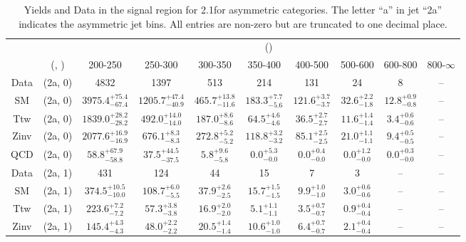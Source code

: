 \begin{table}[h!]
\tiny
\centering
\caption{Yields and Data in the signal region for 2.1\ifb for asymmetric categories. The letter ``a'' in jet \eg ``2a''  indicates the asymmetric jet bins. All entries are non-zero but are truncated to one decimal place.\label{tab:yieldsallqcd_sig_comb_asym}}
\begin{tabular}
{cccccccccc}
	\hline\hline
	&	& \multicolumn{8}{c}{\scalht (\gev)}\\ 
	&	 (\njet, \nb) & 200-250 & 250-300 & 300-350 & 350-400 & 400-500 & 500-600 & 600-800 & 800-$\infty$ \\ [0.8ex] 
\hline
	Data & (2a, 0) & 4832 & 1397 & 513 & 214 & 131 & 24 & 8 & -- \\[0.5ex] 
	SM & (2a, 0) & $3975.4^{+ 75.4 }_{- 67.4 }$ & $1205.7^{+ 47.4 }_{- 40.9 }$ & $465.7^{+ 13.8 }_{- 11.6 }$ & $183.3^{+ 7.7 }_{- 5.6 }$ & $121.6^{+ 3.7 }_{- 3.7 }$ & $32.6^{+ 2.2 }_{- 1.8 }$ & $12.8^{+ 0.9 }_{- 0.8 }$ & -- \\[0.5ex] 
	Ttw & (2a, 0) & $1839.0^{+ 28.2 }_{- 28.2 }$ & $492.0^{+ 14.0 }_{- 14.0 }$ & $187.0^{+ 8.6 }_{- 8.6 }$ & $64.5^{+ 4.6 }_{- 4.6 }$ & $36.5^{+ 2.7 }_{- 2.7 }$ & $11.6^{+ 1.4 }_{- 1.4 }$ & $3.4^{+ 0.6 }_{- 0.6 }$ & -- \\[0.5ex] 
	Zinv & (2a, 0) & $2077.6^{+ 16.9 }_{- 16.9 }$ & $676.1^{+ 8.3 }_{- 8.3 }$ & $272.8^{+ 5.2 }_{- 5.2 }$ & $118.8^{+ 3.2 }_{- 3.2 }$ & $85.1^{+ 2.5 }_{- 2.5 }$ & $21.0^{+ 1.1 }_{- 1.1 }$ & $9.4^{+ 0.5 }_{- 0.5 }$ & -- \\[0.5ex] 
	QCD & (2a, 0) & $58.8^{+ 67.9 }_{- 58.8 }$ & $37.5^{+ 44.5 }_{- 37.5 }$ & $5.8^{+ 9.6 }_{- 5.8 }$ & $0.0^{+ 5.3 }_{- 0.0 }$ & $0.0^{+ 0.4 }_{- 0.0 }$ & $0.0^{+ 1.2 }_{- 0.0 }$ & $0.0^{+ 0.3 }_{- 0.0 }$ & -- \\[0.5ex] 
	Data & (2a, 1) & 431 & 124 & 44 & 15 & 7 & 3 & -- & -- \\[0.5ex] 
	SM & (2a, 1) & $374.5^{+ 10.5 }_{- 10.0 }$ & $108.7^{+ 6.0 }_{- 5.5 }$ & $37.9^{+ 2.6 }_{- 2.5 }$ & $15.7^{+ 1.5 }_{- 1.5 }$ & $9.9^{+ 1.0 }_{- 1.0 }$ & $3.0^{+ 0.6 }_{- 0.6 }$ & -- & -- \\[0.5ex] 
	Ttw & (2a, 1) & $223.6^{+ 7.2 }_{- 7.2 }$ & $57.3^{+ 3.8 }_{- 3.8 }$ & $16.9^{+ 2.0 }_{- 2.0 }$ & $5.1^{+ 1.1 }_{- 1.1 }$ & $3.5^{+ 0.7 }_{- 0.7 }$ & $0.9^{+ 0.4 }_{- 0.4 }$ & -- & -- \\[0.5ex] 
	Zinv & (2a, 1) & $145.4^{+ 4.3 }_{- 4.3 }$ & $48.0^{+ 2.2 }_{- 2.2 }$ & $20.5^{+ 1.4 }_{- 1.4 }$ & $10.6^{+ 1.0 }_{- 1.0 }$ & $6.4^{+ 0.7 }_{- 0.7 }$ & $2.1^{+ 0.4 }_{- 0.4 }$ & -- & -- \\[0.5ex] 

\end{tabular}
\end{table}
